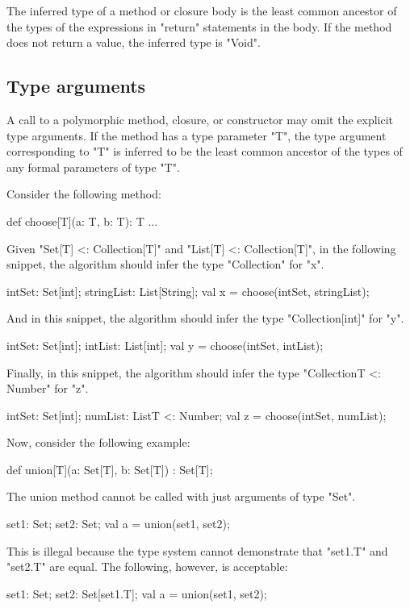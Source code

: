 The inferred type of a method or closure body is the least common ancestor
of the types of the expressions in \xcd"return" statements
in the body.  If the method does not return a value, the
inferred type is \xcd"Void".

\subsection{Type arguments}

A call to a polymorphic method, closure, or constructor may omit the
explicit type arguments.  If the method has a type parameter
\xcd"T", the type argument corresponding to \xcd"T" is inferred
to be the least common ancestor of the types of any formal
parameters of type \xcd"T".

Consider the following method:
\begin{xten}
def choose[T](a: T, b: T): T { ... }
\end{xten}
%
Given \xcd"Set[T] <: Collection[T]"
and \xcd"List[T] <: Collection[T]",
in the following snippet, the algorithm should infer the type
\xcd"Collection" for \xcd"x".
\begin{xten}
intSet: Set[int];
stringList: List[String];
val x = choose(intSet, stringList);
\end{xten}
%
And in this snippet, the algorithm should infer the type
\xcd"Collection[int]" for \xcd"y".
\begin{xten}
intSet: Set[int];
intList: List[int];
val y = choose(intSet, intList);
\end{xten}
%
Finally, in this snippet, the algorithm should infer the type
\xcd"Collection{T <: Number}" for \xcd"z".
\begin{xten}
intSet: Set[int];
numList: List{T <: Number};
val z = choose(intSet, numList);
\end{xten}

Now, consider the following example:
\begin{xten}
def union[T](a: Set[T], b: Set[T]) : Set[T];
\end{xten}
The union method cannot be called with just arguments of type \xcd"Set".
\begin{xten}
set1: Set;
set2: Set;
val a = union(set1, set2);
\end{xten}
This is illegal because the type system cannot demonstrate that
\xcd"set1.T" and \xcd"set2.T" are equal.
The following, however, is acceptable:
\begin{xten}
set1: Set;
set2: Set[set1.T];
val a = union(set1, set2);
\end{xten}

